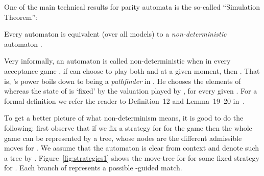 

One of the main technical results for parity automata is the so-called ``Simulation Theorem'':

\begin{theorem}\label{thm:origsimulation}
	Every automaton  is equivalent (over all models) to a \emph{non-deterministic} automaton .
\end{theorem}

Very informally, an automaton  is called non-deterministic when in every acceptance game , if \abelard can choose to play both  and  at a given moment, then . That is, \abelard's power boils down to being a \emph{pathfinder} in . He chooses the elements of  whereas the state of  is `fixed' by the valuation played by \eloise, for every given . For a formal definition we refer the reader to Definition~12 and Lemma~19--20 in~\cite{Walukiewicz96}.

To get a better picture of what non-determinism means, it is good to do the following: first observe that if we fix a strategy  for \eloise for the game  then the whole game can be represented by a tree, whose nodes are the different admissible moves for \abelard. We assume that the automaton is clear from context and denote such a tree by . Figure~\ref{fig:strategies1} shows the move-tree for \abelard for some fixed strategy  for \eloise. Each branch of  represents a possible -guided match.



